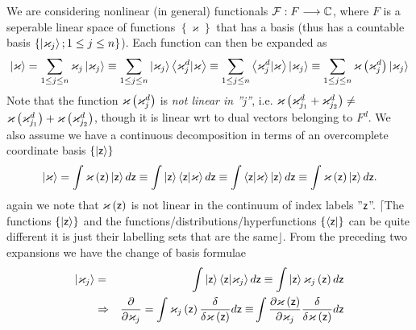 We are considering nonlinear (in general) functionals ${\cal F}%
:F\longrightarrow {\Bbb C}$, where $F$ is a seperable linear space of
functions $\left\{ \varkappa \right\} $ that has a basis (thus has a
countable basis $\left\{ \left| {\bf \varkappa }_{j}\right\rangle ;1\leq
j\leq n\right\} $). Each function can then be expanded as 
\begin{equation}
\left| \varkappa \right\rangle =\sum_{1\leq j\leq n}\varkappa _{j}\left| 
{\bf \varkappa }_{j}\right\rangle \equiv \sum_{1\leq j\leq n}\left| {\bf %
\varkappa }_{j}\right\rangle \left\langle {\bf \varkappa }_{j}^{d}|\varkappa
\right\rangle \equiv \sum_{1\leq j\leq n}\left\langle {\bf \varkappa }%
_{j}^{d}|\varkappa \right\rangle \left| {\bf \varkappa }_{j}\right\rangle
\equiv \sum_{1\leq j\leq n}\varkappa \left( {\bf \varkappa }_{j}^{d}\right)
\left| {\bf \varkappa }_{j}\right\rangle
\end{equation}%
Note that the function $\varkappa \left( {\bf \varkappa }_{j}^{d}\right) $
is {\em not linear in ''j''}, i.e. $\varkappa \left( {\bf \varkappa }%
_{j_{1}}^{d}+{\bf \varkappa }_{j_{2}}^{d}\right) \neq ${\em \ }$\varkappa
\left( {\bf \varkappa }_{j_{1}}^{d}\right) +\varkappa \left( {\bf \varkappa }%
_{j_{2}}^{d}\right) $, though it is linear wrt to dual vectors belonging to $%
F^{d}$. We also assume we have a continuous decomposition in terms of an
overcomplete coordinate basis $\left\{ \left| {\sf z}\right\rangle \right\} $
\begin{equation}
\left| \varkappa \right\rangle =\int \varkappa \left( {\sf z}\right) \left| 
{\sf z}\right\rangle d{\sf z}\equiv \int \left| {\sf z}\right\rangle
\left\langle {\sf z}|\varkappa \right\rangle d{\sf z}\equiv \int
\left\langle {\sf z}|\varkappa \right\rangle \left| {\sf z}\right\rangle d%
{\sf z}\equiv \int \varkappa \left( {\sf z}\right) \left| {\sf z}%
\right\rangle d{\sf z.}
\end{equation}%
again we note that $\varkappa \left( {\sf z}\right) $ is not linear in the
continuum of index labels ''${\sf z}$''. $\lceil $The functions $\left\{
\left| {\sf z}\right\rangle \right\} $ and the
functions/distributions/hyperfunctions $\left\{ \left\langle {\sf z}\right|
\right\} $ can be quite different it is just their labelling sets that are
the same$\rfloor $. From the preceding two expansions we have the change of
basis formulae 
\begin{eqnarray}
\left| {\bf \varkappa }_{j}\right\rangle &=&\int \left| {\sf z}\right\rangle
\left\langle {\sf z}|{\bf \varkappa }_{j}\right\rangle d{\sf z}\equiv \int
\left| {\sf z}\right\rangle \varkappa _{j}\left( {\sf z}\right) d{\sf z} 
\nonumber \\
&\Rightarrow &\frac{\partial }{\partial \varkappa _{j}}=\int \varkappa
_{j}\left( {\sf z}\right) \frac{\delta }{\delta \varkappa \left( {\sf z}%
\right) }d{\sf z\equiv }\int \frac{\partial \varkappa \left( {\sf z}\right) 
}{\partial \varkappa _{j}}\frac{\delta }{\delta \varkappa \left( {\sf z}%
\right) }d{\sf z}  \label{change1}
\end{eqnarray}%
